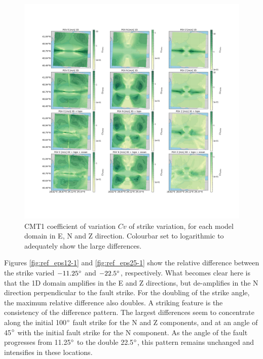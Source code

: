 \documentclass[../Text/00main.tex]{subfiles}
\begin{document}
\begin{figure}[htb]
    \centering
    \includegraphics[width=1\linewidth, trim = 2cm 5cm 1cm 5cm, clip]{images_results/strike_variation_sigma_sc1.png}
    \caption{CMT1 coefficient of variation $Cv$ of strike variation, for each model domain in E, N and Z direction. Colourbar set to logarithmic to adequately show the large differences.}
    \label{fig:ref_sigma1_strike}
\end{figure}

\FloatBarrier

Figures \ref{fig:ref_eps12-1} and \ref{fig:ref_eps25-1} show the relative difference between the strike varied $- 11.25\degree$ and $- 22.5\degree$, respectively. What becomes clear here is that the 1D domain amplifies in the E and Z directions, but de-amplifies in the N direction perpendicular to the fault strike. For the doubling of the strike angle, the maximum relative difference also doubles. A striking feature is the consistency of the difference pattern. The largest differences seem to concentrate along the initial 100$\degree$ fault strike for the N and Z components, and at an angle of 45$\degree$ with the initial fault strike for the N component. As the angle of the fault progresses from 11.25$\degree$ to the double 22.5$\degree$, this pattern remains unchanged and intensifies in these locations. 
\end{document}
